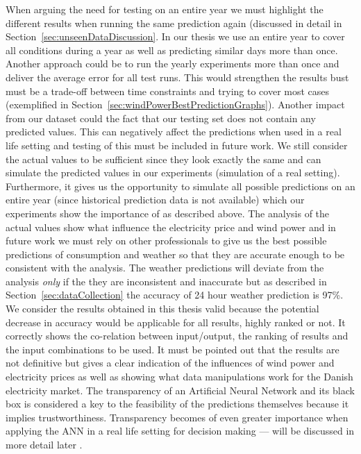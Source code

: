 When arguing the need for testing on an entire year we must highlight the different results when running the same prediction again (discussed in detail in Section~\ref{sec:unseenDataDiscussion}. In our thesis we use an entire year to cover all conditions during a year as well as predicting similar days more than once. Another approach could be to run the yearly experiments more than once and deliver the average error for all test runs. This would strengthen the results bust must be a trade-off between time constraints and trying to cover most cases (exemplified in Section~\ref{sec:windPowerBestPredictionGraphs}). Another impact from our dataset could the fact that our testing set does not contain any predicted values. This can negatively affect the predictions when used in a real life setting and testing of this must be included in future work. We still consider the actual values to be sufficient since they look exactly the same and can simulate the predicted values in our experiments (simulation of a real setting). Furthermore, it gives us the opportunity to simulate all possible predictions on an entire year (since historical prediction data is not available) which our experiments show the importance of as described above. The analysis of the actual values show what influence the electricity price and wind power and in future work we must rely on other professionals to give us the best possible predictions of consumption and weather so that they are accurate enough to be consistent with the analysis. The weather predictions will deviate from the analysis \emph{only} if the they are inconsistent and inaccurate but as described in Section~\ref{sec:dataCollection} the accuracy of 24 hour weather prediction is 97\%. We consider the results obtained in this thesis valid because the potential decrease in accuracy would be applicable for all results, highly ranked or not. It correctly shows the co-relation between input/output, the ranking of results and the input combinations to be used. It must be pointed out that the results are not definitive but gives a clear indication of the influences of wind power and electricity prices as well as showing what data manipulations work for the Danish electricity market. The transparency of an Artificial Neural Network and its black box is considered a key to the feasibility of the predictions themselves because it implies trustworthiness. Transparency becomes of even greater importance when applying the ANN in a real life setting for decision making --- will be discussed in more detail later .

